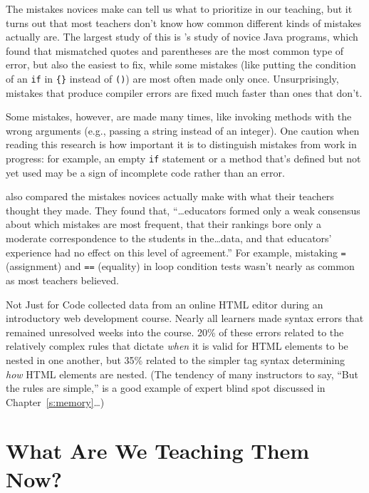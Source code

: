 The mistakes novices make can tell us what to prioritize in our
teaching, but it turns out that most teachers don't know how common
different kinds of mistakes actually are. The largest study of this is
\cite{Brow2017}'s study of novice Java programs, which found that
mismatched quotes and parentheses are the most common type of error, but
also the easiest to fix, while some mistakes (like putting the condition
of an \texttt{if} in \texttt{\{\}} instead of \texttt{()}) are most often made only once.
Unsurprisingly, mistakes that produce compiler errors are fixed much
faster than ones that don't.

Some mistakes, however, are made many times, like invoking methods with
the wrong arguments (e.g., passing a string instead of an integer). One
caution when reading this research is how important it is to distinguish
mistakes from work in progress: for example, an empty \texttt{if} statement or
a method that's defined but not yet used may be a sign of incomplete
code rather than an error.

\cite{Brow2017} also compared the mistakes novices actually make with
what their teachers thought they made. They found that,
``{\ldots}educators formed only a weak consensus about which
mistakes are most frequent, that their rankings bore only a moderate
correspondence to the students in the{\ldots}data, and that
educators' experience had no effect on this level of agreement.'' For
example, mistaking \texttt{=} (assignment) and \texttt{==} (equality) in loop
condition tests wasn't nearly as common as most teachers believed.

\begin{aside}{Not Just for Code}
  \cite{Park2015} collected data from an online HTML editor during an
  introductory web development course. Nearly all learners made syntax
  errors that remained unresolved weeks into the course. 20\% of these
  errors related to the relatively complex rules that dictate \emph{when} it
  is valid for HTML elements to be nested in one another, but 35\%
  related to the simpler tag syntax determining \emph{how} HTML elements are
  nested. (The tendency of many instructors to say, ``But the rules are
  simple,'' is a good example of expert blind spot discussed in
  Chapter~\ref{s:memory}{\ldots})
\end{aside}

\section{What Are We Teaching Them Now?}\label{s:pck-now}

